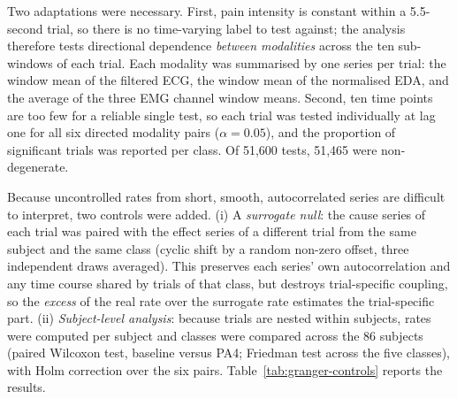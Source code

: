 Two adaptations were necessary. First, pain intensity is constant within a 5.5-second trial, so there is no time-varying label to test against; the analysis therefore tests directional dependence \emph{between modalities} across the ten sub-windows of each trial. Each modality was summarised by one series per trial: the window mean of the filtered ECG, the window mean of the normalised EDA, and the average of the three EMG channel window means. Second, ten time points are too few for a reliable single test, so each trial was tested individually at lag one for all six directed modality pairs ($\alpha = 0.05$), and the proportion of significant trials was reported per class. Of 51{,}600 tests, 51{,}465 were non-degenerate.

Because uncontrolled rates from short, smooth, autocorrelated series are difficult to interpret, two controls were added. (i) A \emph{surrogate null}: the cause series of each trial was paired with the effect series of a different trial from the same subject and the same class (cyclic shift by a random non-zero offset, three independent draws averaged). This preserves each series' own autocorrelation and any time course shared by trials of that class, but destroys trial-specific coupling, so the \emph{excess} of the real rate over the surrogate rate estimates the trial-specific part. (ii) \emph{Subject-level analysis}: because trials are nested within subjects, rates were computed per subject and classes were compared across the 86 subjects (paired Wilcoxon test, baseline versus PA4; Friedman test across the five classes), with Holm correction over the six pairs. Table~\ref{tab:granger-controls} reports the results.

